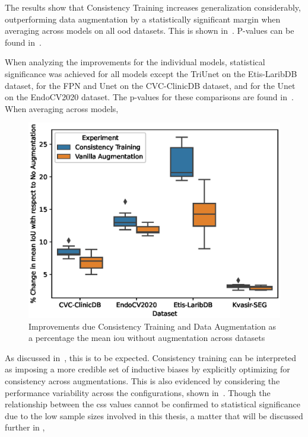 The results show that Consistency Training increases generalization considerably, outperforming data augmentation by a statistically significant margin when averaging across models on all \gls{ood} datasets. This is shown in~. P-values can be found in~. 

When analyzing the improvements for the individual models, statistical significance was achieved for all models except the TriUnet on the Etis-LaribDB dataset, for the FPN and Unet on the CVC-ClinicDB dataset, and for the Unet on the EndoCV2020 dataset. The p-values for these comparisons are found in~. When averaging across models, 
\begin{figure}[htb]
    \centering
    \includegraphics[width=\linewidth]{illustrations/consistency_training_percent.eps}
    \caption[Consistency Training improvements]{Improvements due Consistency Training and Data Augmentation as a percentage the mean \gls{iou} without augmentation across datasets}
    \label{fig:consistency_training_improvement}
\end{figure}

As discussed in~, this is to be expected. Consistency training can be interpreted as imposing a more credible set of inductive biases by explicitly optimizing for consistency across augmentations. This is also evidenced by considering the performance variability across the configurations,  shown in~. Though the relationship between the \glspl{cs} values cannot be confirmed to statistical significance due to the low sample sizes involved in this thesis, a matter that will be discussed further in , 

